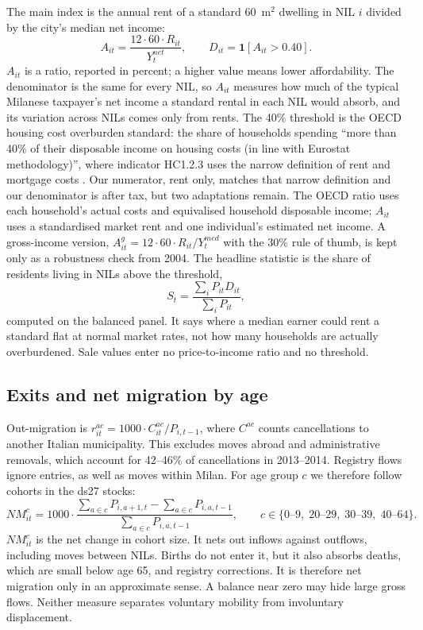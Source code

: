 The main index is the annual rent of a standard 60~m$^2$ dwelling in NIL $i$
divided by the city's median net income:
\begin{equation}\label{eq:index}
A_{it}=\frac{12\cdot 60\cdot R_{it}}{Y^{net}_t},\qquad
D_{it}=\mathbf{1}\left[A_{it}>0.40\right].
\end{equation}
$A_{it}$ is a ratio, reported in percent; a higher value means lower
affordability. The denominator is the same for every NIL, so $A_{it}$
measures how much of the typical Milanese taxpayer's net income a standard
rental in each NIL would absorb, and its variation across NILs comes only
from rents. The 40\% threshold is the OECD housing cost overburden standard:
the share of households spending ``more than 40\% of their disposable income
on housing costs (in line with Eurostat methodology)'', where indicator
HC1.2.3 uses the narrow definition of rent and mortgage costs
\citep{oecd2024,eurostat}. Our numerator, rent only, matches that narrow
definition and our denominator is after tax, but two adaptations remain. The
OECD ratio uses each household's actual costs and equivalised household
disposable income; $A_{it}$ uses a standardised market rent and one
individual's estimated net income. A gross-income version,
$A^{g}_{it}=12\cdot60\cdot R_{it}/Y^{med}_t$ with the 30\% rule of thumb, is
kept only as a robustness check from 2004. The headline statistic is the
share of residents living in NILs above the threshold,
\begin{equation}\label{eq:share}
S_t=\frac{\sum_i P_{it}D_{it}}{\sum_i P_{it}},
\end{equation}
computed on the balanced panel. It says where a median earner could rent a
standard flat at normal market rates, not how many households are actually
overburdened. Sale values enter no price-to-income ratio and no threshold.

\subsection{Exits and net migration by age}\label{sec:mobility}

Out-migration is $r^{ac}_{it}=1000\cdot C^{ac}_{it}/P_{i,t-1}$, where
$C^{ac}$ counts cancellations to another Italian municipality. This excludes
moves abroad and administrative removals, which account for 42--46\% of
cancellations in 2013--2014. Registry flows ignore entries, as well as moves
within Milan. For age group $c$ we therefore follow cohorts in the ds27
stocks:
\begin{equation}\label{eq:netmig}
NM^{c}_{it}=1000\cdot\frac{\sum_{a\in c}P_{i,a+1,t}-\sum_{a\in c}P_{i,a,t-1}}
{\sum_{a\in c}P_{i,a,t-1}},
\qquad c\in\{0\text{--}9,\;20\text{--}29,\;30\text{--}39,\;40\text{--}64\}.
\end{equation}
$NM^{c}_{it}$ is the net change in cohort size. It nets out inflows against
outflows, including moves between NILs. Births do not enter it, but it also
absorbs deaths, which are small below age 65, and registry corrections. It is
therefore net migration only in an approximate sense. A balance near zero may
hide large gross flows. Neither measure separates voluntary mobility from
involuntary displacement.

